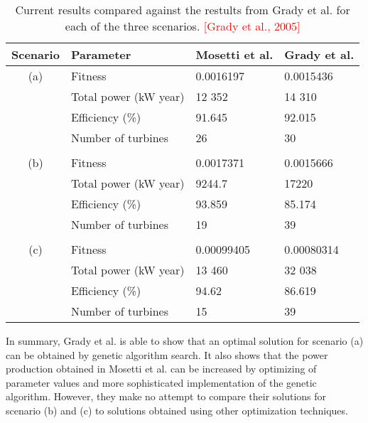 \begin{table}[h!]
\begin{center}
\caption{Current results compared against the restults from Grady et al. for each of the three scenarios. \textcolor{red}{[Grady et al., 2005]}}
\label{Results Grady et al.}
\begin{tabular}{c|l|l|l}
Scenario & Parameter                    & Mosetti et al.  & Grady et al. \\ 
\hline 
(a)          & Fitness                        & 0.0016197     & 0.0015436 \\ 
              & Total power (kW year) & 12 352           & 14 310 \\ 
              & Efficiency (\%)            & 91.645            & 92.015 \\ 
              & Number of turbines     & 26                    & 30  \\ 
&&&\\
(b)         & Fitness                        & 0.0017371      & 0.0015666 \\ 
              & Total power (kW year) & 9244.7           & 17220 \\ 
              & Efficiency (\%)            & 93.859           & 85.174 \\ 
              & Number of turbines     & 19                   & 39 \\ 
&&&\\
(c)         & Fitness                        & 0.00099405   & 0.00080314 \\ 
              & Total power (kW year) & 13 460          & 32 038 \\ 
              & Efficiency (\%)            & 94.62            & 86.619 \\ 
              & Number of turbines     & 15                  & 39 \\  
\end{tabular} 
\end{center}
\end{table}


\noindent In summary, Grady et al. is able to show that an optimal solution for scenario (a) can be obtained by genetic algorithm search. It also shows that the power production obtained in Mosetti et al. can be increased by optimizing of parameter values and more sophisticated implementation of the genetic algorithm. However, they make no attempt to compare their solutions for scenario (b) and (c) to solutions obtained using other optimization techniques.\\


